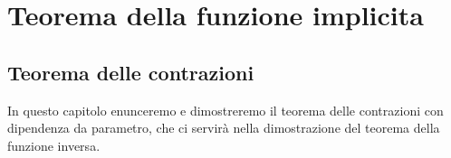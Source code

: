 \chapter{Teorema della funzione implicita}

\newtheorem{definizione}{Definizione}[section]
\newtheorem{teorema}{Teorema}[section]
\newtheorem{lemma}{Lemma}[section]
\theoremstyle{definition}
\newtheorem{esempio}{Esempio}[section]
\newtheorem{osservazione}{Osservazione}[section]


\section{Teorema delle contrazioni}

In questo capitolo enunceremo e dimostreremo il teorema delle contrazioni con dipendenza da parametro, che ci servirà nella dimostrazione del teorema della funzione inversa.

